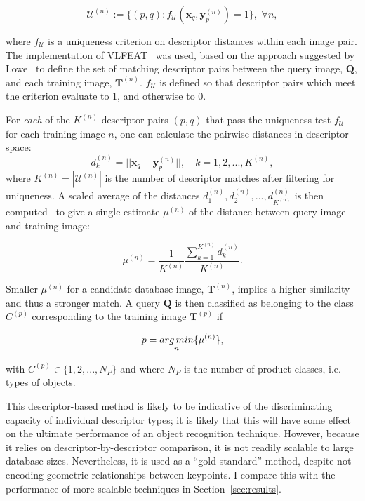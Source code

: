 \begin{equation}
\mathcal{U}^{(n)} := \lbrace (p,q): f_\mathcal{U}(\mathbf{x}_q,\mathbf{y}_p^{(n)})=1\rbrace,\,\,\forall n,
\end{equation}

where $f_{\mathcal{U}}$ is a uniqueness criterion on descriptor distances within each image pair. The implementation of VLFEAT~\cite{Vedaldi2008} was used, based on the approach suggested by Lowe~\cite{lowe2004distinctive} to define the set of matching descriptor pairs between the query image, $\mathbf{Q}$, and each training image, $\mathbf{T}^{(n)}$. $f_{\mathcal{U}}$ is defined so that descriptor pairs which meet the criterion evaluate to 1, and otherwise to 0. 

For \textit{each} of the $K^{(n)}$ descriptor pairs $(p,q)$ that pass the uniqueness test $f_{\mathcal{U}}$ for each training image $n$, one can calculate the pairwise distances in descriptor space:
\begin{equation}
d_k^{(n)} =  ||\mathbf{x}_q-\mathbf{y}_p^{(n)}||, \quad k = 1,2,...,K^{(n)},
\label{EucDistance}
\end{equation}
where $K^{(n)} = |\mathcal{U}^{(n)}|$ is the number of descriptor matches after filtering for uniqueness. A scaled average of the distances $d_1^{(n)},d_2^{(n)},...,d_{K^{(n)}}^{(n)}$ is then computed~\cite{Li2009} to give a single estimate $\mu^{(n)}$ of the distance between query image and training image:

\begin{equation}
\mu^{(n)} = \frac{1}{K^{(n)}}\frac{\sum_{k=1}^{K^{(n)}} d_k^{(n)}}{K^{(n)}}.
\label{eqScore}
\end{equation}

Smaller $\mu^{(n)}$ for a candidate database image, $\mathbf{T}^{(n)}$, implies a higher similarity and thus a stronger match.
A query $\textbf{Q}$ is then classified as belonging to the class $C^{(p)}$ corresponding to the training image $\mathbf{T}^{(p)}$ if

\begin{equation}
p = \underset{n}{arg\,min}\lbrace \mu^{(n)}\rbrace,
\end{equation}

\noindent with $C^{(p)} \in \lbrace 1, 2,..., N_P\rbrace $ and where $N_P$ is the number of product classes, i.e. types of objects.

This descriptor-based method is likely to be indicative of the discriminating capacity of individual descriptor types; it is likely that this will have some effect on the ultimate performance of an object recognition technique. However, because it relies on descriptor-by-descriptor comparison, it is not readily scalable to large database sizes. Nevertheless, it is used as a ``gold standard'' method, despite not encoding geometric relationships between keypoints. I compare this with the performance of more scalable techniques in Section~\ref{sec:results}.

